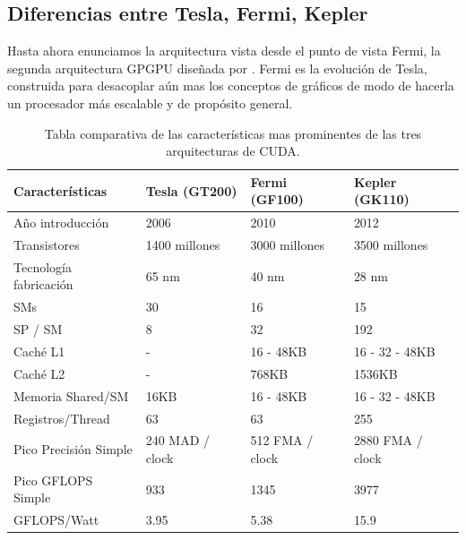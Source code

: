 \subsection{Diferencias entre Tesla, Fermi, Kepler}

Hasta ahora enunciamos la arquitectura vista desde el punto de vista Fermi, la segunda
arquitectura GPGPU dise\~nada por \nvidia . Fermi es la evoluci\'on de Tesla,
construida para desacoplar a\'un mas los conceptos de gr\'aficos de modo de hacerla
un procesador m\'as escalable y de prop\'osito general.


\begin{table}[h]
  \begin{tabular}{@{}llll@{}}
  \toprule
  Caracter\'isticas        & Tesla (GT200)   & Fermi (GF100)   & Kepler (GK110)   \\ \midrule
  A\~no introducci\'on     & 2006            & 2010            & 2012             \\
  Transistores             & 1400 millones   & 3000 millones   & 3500 millones    \\
  Tecnolog\'ia fabricaci\'on & 65 nm           & 40 nm           & 28 nm            \\
  SMs                      & 30              & 16              & 15               \\
  SP / SM                  & 8               & 32              & 192              \\
  Cach\'e L1               & -               & 16 - 48KB       & 16 - 32 - 48KB   \\
  Cach\'e L2               & -               & 768KB           & 1536KB           \\
  Memoria Shared/SM      & 16KB            & 16 - 48KB       & 16 - 32 - 48KB   \\
  Registros/Thread         & 63              & 63              & 255              \\
  Pico Precisi\'on Simple    & 240 MAD / clock & 512 FMA / clock & 2880 FMA / clock \\
  Pico GFLOPS Simple       & 933             & 1345            & 3977             \\
  GFLOPS/Watt              & 3.95            & 5.38            & 15.9             \\ \bottomrule
  \end{tabular}
\caption{Tabla comparativa de las caracter\'isticas mas prominentes de las tres arquitecturas de CUDA.}
\label{tab:CudaGenerations}
\end{table}

